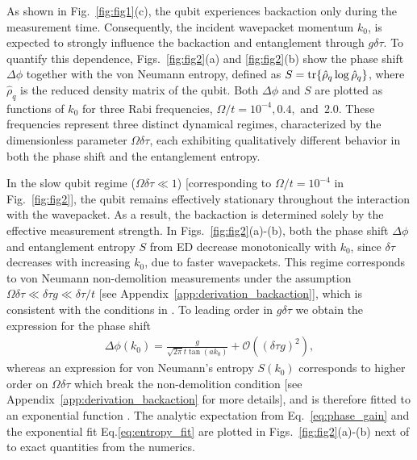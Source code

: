 \documentclass[10pt,
 amsmath,amssymb,
 aps,prb, twocolumn
]{revtex4-2}
\newcommand\sj[1]{ {\color{cyan} #1} }
\begin{document}
As shown in Fig.~\ref{fig:fig1}(c), the qubit experiences backaction only during the measurement time. Consequently, the incident wavepacket momentum $k_0$, is expected to strongly influence the backaction and entanglement through $g\delta \tau$. To quantify this dependence, Figs.~\ref{fig:fig2}(a) and \ref{fig:fig2}(b) show the phase shift \mbox{$\Delta\phi$} together with the von Neumann entropy, defined as \mbox{$S=\tr{\hat{\rho}_q\log{\hat{\rho}_q}}$}, where \mbox{$\hat{\rho}_q$} is the reduced density matrix of the qubit. Both \mbox{$\Delta\phi$} and \mbox{$S$} are plotted as functions of \mbox{$k_0$} for three Rabi frequencies, \mbox{$\Omega/t=10^{-4},0.4$, and $2.0$}. These frequencies represent three distinct dynamical regimes, characterized by the dimensionless parameter \mbox{$\Omega\delta\tau$}, each exhibiting qualitatively different behavior in both the phase shift and the entanglement entropy.

In the slow qubit regime (\mbox{$\Omega\delta\tau\ll1$}) [corresponding to \mbox{$\Omega/t=10^{-4}$} in Fig.~\ref{fig:fig2}], the qubit remains effectively stationary throughout the interaction with the wavepacket. As a result, the backaction is determined solely by the effective measurement strength. In Figs.~\ref{fig:fig2}(a)-(b), both the phase shift \mbox{$\Delta\phi$} and entanglement entropy \mbox{$S$} from ED decrease monotonically with $k_0$, since \mbox{$\delta\tau$} decreases with increasing $k_0$, due to faster wavepackets. This regime corresponds to \sj{von Neumann non-demolition measurements} \cite{braginskyNondemolition1996} under the assumption \mbox{$\Omega\delta\tau \ll \delta\tau g \ll \delta\tau/t$} [see Appendix~\ref{app:derivation_backaction}], which is consistent with the conditions in \cite{korotkovMeasurementDoubleDot1999, gurvitz1997}. To leading order in \mbox{$g\delta \tau$} we obtain the expression for the phase shift 
\begin{align}\label{eq:phase_gain}
    \Delta \phi (k_0) = \frac{g}{\sqrt{2\pi}t\tan{(ak_0)}} +\mathcal{O}((\delta \tau g)^2), 
\end{align}
 \sj{whereas an expression for von Neumann's entropy \mbox{$S(k_0)$} corresponds to higher order on \mbox{$\Omega \delta \tau$} which break the non-demolition condition} [see Appendix~\ref{app:derivation_backaction} for more details], \sj{and is therefore fitted to an exponential function}. \sj{The analytic} expectation from Eq.~\eqref{eq:phase_gain} \sj{and the exponential fit Eq.\eqref{eq:entropy_fit}} are plotted in Figs.~\ref{fig:fig2}(a)-(b) next of to exact quantities from the numerics.
\end{document}
